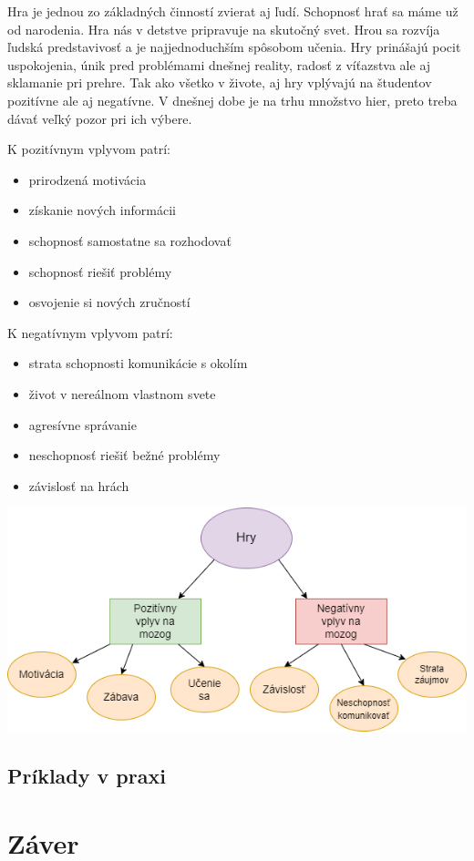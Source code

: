 \documentclass[10pt,twoside,slovak,a4paper]{article}
\begin{document}
Hra je jednou zo základných činností zvierat aj ľudí. Schopnosť hrať sa máme už od narodenia. Hra nás v detstve pripravuje na skutočný svet. Hrou sa rozvíja ľudská predstavivosť a je najjednoduchším spôsobom učenia. Hry prinášajú pocit uspokojenia, únik pred problémami dnešnej reality, radosť z víťazstva ale aj sklamanie pri prehre.  Tak ako všetko v živote, aj hry vplývajú na študentov pozitívne ale aj negatívne. V dnešnej dobe je na trhu množstvo hier, preto treba dávať veľký pozor pri ich výbere.

\vspace{5mm}
K pozitívnym vplyvom patrí: 

\begin{itemize}
\item prirodzená motivácia
\item získanie nových informácii
\item schopnosť samostatne sa rozhodovať
\item schopnosť riešiť problémy
\item osvojenie si nových zručností
\end{itemize}

\vspace{5mm}
K negatívnym vplyvom patrí: 

\begin{itemize}
\item strata schopnosti komunikácie s okolím
\item život v nereálnom vlastnom svete
\item agresívne správanie
\item neschopnosť riešiť bežné problémy
\item závislosť na hrách
\end{itemize}


\includegraphics[scale=0.5]{vplyv_na_mozog.drawio.png}


\subsection{Príklady v praxi} \label{Prax}


\section{Záver}






\end{document}
